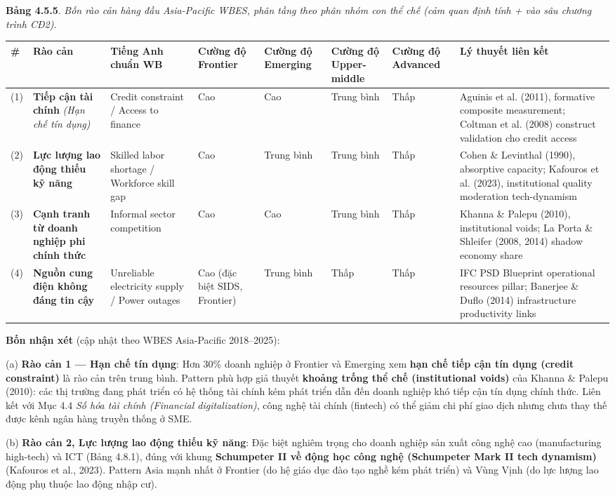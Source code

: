 \documentclass[12pt,a4paper]{article}
\begin{document}
\textbf{Bảng 4.5.5}. \emph{Bốn rào cản hàng đầu Asia-Pacific WBES, phân
tầng theo phân nhóm con thể chế (cảm quan định tính + vào sâu chương
trình CĐ2).}

\begin{longtable}[]{@{}llllllll@{}}
\toprule\noalign{}
\# & Rào cản & Tiếng Anh chuẩn WB & Cường độ Frontier & Cường độ
Emerging & Cường độ Upper-middle & Cường độ Advanced & Lý thuyết liên
kết \\
\midrule\noalign{}
\endhead
\bottomrule\noalign{}
\endlastfoot
(1) & \textbf{Tiếp cận tài chính} \emph{(Hạn chế tín dụng)} & Credit
constraint / Access to finance & Cao & Cao & Trung bình & Thấp & Aguinis
et al. (2011), formative composite measurement; Coltman et al. (2008)
construct validation cho credit access \\
(2) & \textbf{Lực lượng lao động thiếu kỹ năng} & Skilled labor shortage
/ Workforce skill gap & Cao & Trung bình & Trung bình & Thấp & Cohen \&
Levinthal (1990), absorptive capacity; Kafouros et al. (2023),
institutional quality moderation tech-dynamism \\
(3) & \textbf{Cạnh tranh từ doanh nghiệp phi chính thức} & Informal
sector competition & Cao & Cao & Trung bình & Thấp & Khanna \& Palepu
(2010), institutional voids; La Porta \& Shleifer (2008, 2014) shadow
economy share \\
(4) & \textbf{Nguồn cung điện không đáng tin cậy} & Unreliable
electricity supply / Power outages & Cao (đặc biệt SIDS, Frontier) &
Trung bình & Thấp & Thấp & IFC PSD Blueprint operational resources
pillar; Banerjee \& Duflo (2014) infrastructure productivity links \\
\end{longtable}

\textbf{Bốn nhận xét} (cập nhật theo WBES Asia-Pacific 2018--2025):

(a) \textbf{Rào cản 1 --- Hạn chế tín dụng}: Hơn 30\% doanh nghiệp ở
Frontier và Emerging xem \textbf{hạn chế tiếp cận tín dụng (credit
constraint)} là rào cản trên trung bình. Pattern phù hợp giả thuyết
\textbf{khoảng trống thể chế (institutional voids)} của Khanna \& Palepu
(2010): các thị trường đang phát triển có hệ thống tài chính kém phát
triển dẫn đến doanh nghiệp khó tiếp cận tín dụng chính thức. Liên kết
với Mục 4.4 \emph{Số hóa tài chính (Financial digitalization)}, công
nghệ tài chính (fintech) có thể giảm chi phí giao dịch nhưng chưa thay
thế được kênh ngân hàng truyền thống ở SME.

(b) \textbf{Rào cản 2, Lực lượng lao động thiếu kỹ năng}: Đặc biệt
nghiêm trọng cho doanh nghiệp sản xuất công nghệ cao (manufacturing
high-tech) và ICT (Bảng 4.8.1), đúng với khung \textbf{Schumpeter II về
động học công nghệ (Schumpeter Mark II tech dynamism)} (Kafouros et al.,
2023). Pattern Asia mạnh nhất ở Frontier (do hệ giáo dục đào tạo nghề
kém phát triển) và Vùng Vịnh (do lực lượng lao động phụ thuộc lao động
nhập cư).
\end{document}
